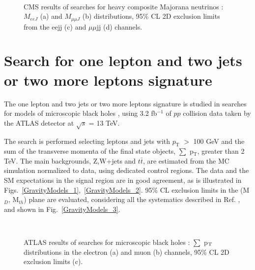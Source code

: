 \documentclass[10pt]{article}
\begin{document}
\vspace{-0.35cm}
\begin{figure}[h!]
\hspace{0.15cm}
\
\hspace{0.15cm}
\hspace{0.15cm}
\vspace{-0.35cm}
\caption{CMS results of searches for heavy composite Majorana neutrinos \cite{HCMN_CMS}: $M_{eeJ}$ (a) and $M_{\mu\mu J}$ (b) distributions,
95\% CL 2D exclusion limits from the eejj (c) and $\mu\mu$jj (d) channels.
}
\label{some example}
\end{figure}

\vspace{-0.75cm}
\section{Search for one lepton and two jets or two more leptons signature}
\vspace{-0.15cm}
The one lepton and two jets or two more leptons signature is studied in searches for models of microscopic black holes \cite{BH_ATLAS},
using 3.2 fb$^{-1}$ of $pp$ collision data taken by the ATLAS detector at $\sqrt{s}$ = 13 TeV.

The search is performed selecting leptons and jets with $p_\mathrm{T}$ $>$ 100 GeV and the sum of the transverse momenta of the final state objects, $\sum$ p$_\mathrm{T}$, greater than 2 TeV.
The main backgrounds, Z,W+jets and $t\bar{t}$, are estimated from the MC simulation normalized to data, using dedicated control regions.
The data and the SM expectations in the signal region are in good agreement, as is illustrated in Figs.~\ref{GravityModels_1},~\ref{GravityModels_2}.
95\% CL exclusion limits in the (M$_{D}$, M$_{th}$) plane are evaluated,
considering all the systematics described in Ref. \cite{BH_ATLAS}, and shown in Fig.~\ref{GravityModels_3}.

\vspace{-0.35cm}
\begin{figure}[h!]
\hspace{2.75cm}
\
\hspace{2.75cm}
\subfloat[]{\label{GravityModels_3}\texttt{[image: GravityModels\_3.png]}}
\vspace{-0.35cm}
\caption{ATLAS results of searches for microscopic black holes \cite{BH_ATLAS}: $\sum$ p$_{\scriptsize\textrm{T}}$ distributions in the electron (a) and muon (b) channels,
95\% CL 2D exclusion limits (c).
}
\label{some example}
\end{figure}
\end{document}
